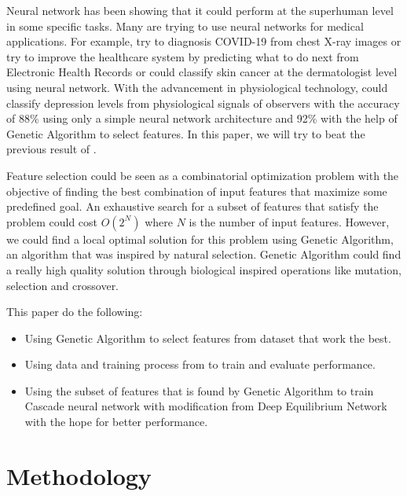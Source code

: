 \documentclass[runningheads]{llncs}
\begin{document}
Neural network has been showing that it could perform at the superhuman level in some specific tasks. Many are trying to use neural networks for medical applications. For example, \cite{x_ray1_Bassi_2021} \cite{x_ray2_SAHA2021100505} try to diagnosis COVID-19 from chest X-ray images or \cite{Rajkomar2018}try to improve the healthcare system by predicting what to do next from Electronic Health Records or \cite{Esteva2017} could classify skin cancer at the dermatologist level using neural network. With the advancement in physiological technology, \cite{data_paper} could classify depression levels from physiological signals of observers with the accuracy of 88\% using only a simple neural network architecture and 92\% with the help of Genetic Algorithm to select features. In this paper, we will try to beat the previous result of \cite{data_paper}.

Feature selection could be seen as a combinatorial optimization problem with the objective of finding the best combination of input features that maximize some predefined goal. An exhaustive search for a subset of features that satisfy the problem could cost $O(2^{N})$ where $N$ is the number of input features. However, we could find a local optimal solution for this problem using Genetic Algorithm, an algorithm that was inspired by natural selection. Genetic Algorithm could find a really high quality solution through biological inspired operations like mutation, selection and crossover.

This paper do the following:
\begin{itemize}
    \item Using Genetic Algorithm to select features from dataset that work the best.
    \item Using data and training process from \cite{data_paper} to train and evaluate performance.
    \item Using the subset of features that is found by Genetic Algorithm to train Cascade neural network \cite{casper_paper} with modification from Deep Equilibrium Network \cite{deq_paper} with the hope for better performance.
\end{itemize}

\section{Methodology}
\end{document}
